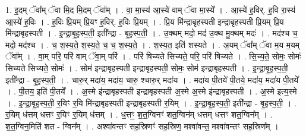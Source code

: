 \documentclass[17pt]{extarticle}
\begin{document}
1. इ॒दम् ॅवा᳚म् ॅवा मि॒द मि॒दम् ॅवा᳚म् । . वा॒ मा॒स्य॑ आ॒स्ये॑ वाम् ॅवा मा॒स्ये᳚ । . आ॒स्ये॑ ह॒विर्. ह॒वि रा॒स्य॑ आ॒स्ये॑ ह॒विः । . ह॒विः प्रि॒यम् प्रि॒यꣳ ह॒विर्. ह॒विः प्रि॒यम् । . प्रि॒य मि॑न्द्राबृहस्पती इन्द्राबृहस्पती प्रि॒यम् प्रि॒य मि॑न्द्राबृहस्पती । . इ॒न्द्रा॒बृ॒ह॒स्प॒ती॒ इती᳚न्द्रा - बृ॒ह॒स्प॒ती॒ । . उ॒क्थम् मदो॒ मद॑ उ॒क्थ मु॒क्थम् मदः॑ । . मद॑श्च च॒ मदो॒ मद॑श्च । . च॒ श॒स्य॒ते॒ श॒स्य॒ते॒ च॒ च॒ श॒स्य॒ते॒ । . श॒स्य॒त॒ इति॑ शस्यते । . अ॒यम् ॅवा᳚म् ॅवा म॒य म॒यम् ॅवा᳚म् । . वा॒म् परि॒ परि॑ वाम् ॅवा॒म् परि॑ । . परि॑ षिच्यते सिच्यते॒ परि॒ परि॑ षिच्यते । . सि॒च्य॒ते॒ सोमः॒ सोमः॑ सिच्यते सिच्यते॒ सोमः॑ । . सोम॑ इन्द्राबृहस्पती इन्द्राबृहस्पती॒ सोमः॒ सोम॑ इन्द्राबृहस्पती । . इ॒न्द्रा॒बृ॒ह॒स्प॒ती॒ इती᳚न्द्रा - बृ॒ह॒स्प॒ती॒ । . चारु॒र् मदा॑य॒ मदा॑य॒ चारु॒ श्चारु॒र् मदा॑य । . मदा॑य पी॒तये॑ पी॒तये॒ मदा॑य॒ मदा॑य पी॒तये᳚ । . पी॒तय॒ इति॑ पी॒तये᳚ । . अ॒स्मे इ॑न्द्राबृहस्पती इन्द्राबृहस्पती अ॒स्मे अ॒स्मे इ॑न्द्राबृहस्पती । . अ॒स्मे इत्य॒स्मे । . इ॒न्द्रा॒बृ॒ह॒स्प॒ती॒ र॒यिꣳ र॒यि मि॑न्द्राबृहस्पती इन्द्राबृहस्पती र॒यिम् । . इ॒न्द्रा॒बृ॒ह॒स्प॒ती॒ इती᳚न्द्रा - बृ॒ह॒स्प॒ती॒ । . र॒यिम् ध॑त्तम् धत्तꣳ र॒यिꣳ र॒यिम् ध॑त्तम् । . ध॒त्तꣳ॒॒ श॒त॒ग्विनꣳ॑ शत॒ग्विन॑म् धत्तम् धत्तꣳ शत॒ग्विन᳚म् । . श॒त॒ग्विन॒मिति॑ शत - ग्विन᳚म् । . अश्वा॑वन्तꣳ सह॒स्रिणꣳ॑ सह॒स्रिण॒ मश्वा॑वन्त॒ मश्वा॑वन्तꣳ सह॒स्रिण᳚म् । \newline
\end{document}
